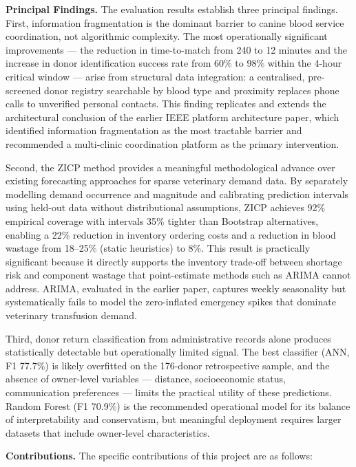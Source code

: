 \documentclass[12pt,a4paper]{article}
\begin{document}
\vspace{1.5em}
\noindent\textbf{Principal Findings.} The evaluation results establish three principal findings. First, information fragmentation is the dominant barrier to canine blood service coordination, not algorithmic complexity. The most operationally significant improvements — the reduction in time-to-match from 240 to 12 minutes and the increase in donor identification success rate from 60\% to 98\% within the 4-hour critical window — arise from structural data integration: a centralised, pre-screened donor registry searchable by blood type and proximity replaces phone calls to unverified personal contacts. This finding replicates and extends the architectural conclusion of the earlier IEEE platform architecture paper, which identified information fragmentation as the most tractable barrier and recommended a multi-clinic coordination platform as the primary intervention.

\noindent Second, the ZICP method provides a meaningful methodological advance over existing forecasting approaches for sparse veterinary demand data. By separately modelling demand occurrence and magnitude and calibrating prediction intervals using held-out data without distributional assumptions, ZICP achieves 92\% empirical coverage with intervals 35\% tighter than Bootstrap alternatives, enabling a 22\% reduction in inventory ordering costs and a reduction in blood wastage from 18--25\% (static heuristics) to 8\%. This result is practically significant because it directly supports the inventory trade-off between shortage risk and component wastage that point-estimate methods such as ARIMA cannot address. ARIMA, evaluated in the earlier paper, captures weekly seasonality but systematically fails to model the zero-inflated emergency spikes that dominate veterinary transfusion demand.

\noindent Third, donor return classification from administrative records alone produces statistically detectable but operationally limited signal. The best classifier (ANN, F1 77.7\%) is likely overfitted on the 176-donor retrospective sample, and the absence of owner-level variables — distance, socioeconomic status, communication preferences — limits the practical utility of these predictions. Random Forest (F1 70.9\%) is the recommended operational model for its balance of interpretability and conservatism, but meaningful deployment requires larger datasets that include owner-level characteristics.

\vspace{1.5em}
\noindent\textbf{Contributions.} The specific contributions of this project are as follows:
\end{document}
